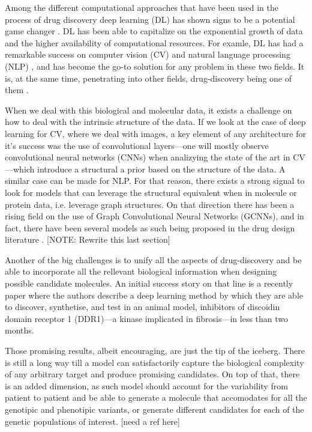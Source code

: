 \documentclass{article}
\begin{document}
Among the different computational approaches that have been used in the process of drug
 discovery deep learning (DL) has shown signs to be a potential game changer
 \cite{Dargan2019}. DL has been able to capitalize on the exponential growth of data and
 the higher availability of computational resources. For examle, DL has had a remarkable
 success on computer vision (CV) \cite{CV} and natural language processing (NLP)
 \cite{NLP}, and has become the go-to solution for any problem in these two fields. It
 is, at the same time, penetrating into other fields, drug-discovery being one of them
 \cite{Chen2018}. 

When we deal with this biological and molecular data, it exists a challenge on how to
 deal with the intrinsic structure of the data.
 If we look at the case of deep learning for CV, where we deal with images, a key
 element of any architecture for it's success was the use of convolutional layers---one
 will mostly observe convolutional neural networks (CNNs) when analizying the state of
 the art in CV---which introduce a structural a prior based on the structure of the
 data\cite{CNNs}. A similar case can be made for NLP\cite{Somethings?}. For that reason,
 there exists a strong signal to look for models that can leverage the structural
 equivalent when in molecule or protein data, i.e. leverage graph structures. On that
 direction there has been a rising field on the use of Graph Convolutional Neural
 Networks (GCNNs)\cite{Wu2019}, and in fact, there have been several models as such
 being proposed in the drug design literature \cite{Sun2019}. [NOTE: Rewrite this last
 section]

Another of the big challenges is to unify all the aspects of drug-discovery and be able
 to incorporate all the rellevant biological information when designing possible
 candidate molecules. An initial success story on that line is a recently paper
 \cite{Zhavoronkov2019} where the authors describe a deep learning method by which they
 are able to discover, synthetise, and test in an animal model, inhibitors of discoidin
 domain receptor 1 (DDR1)—a kinase implicated in fibrosis—in less than two months.

Those promising results, albeit encouraging, are just the tip of the iceberg. There is
still a long way till a model can satisfactorily capture the biological complexity of
any arbitrary target and produce promising candidates. On top of that, there is an added
dimension, as such model should account for the variability from patient to patient and
be able to generate a molecule that accomodates for all the genotipic and phenotipic
variants, or generate different candidates for each of the genetic populations of
interest. [need a ref here]
\end{document}
